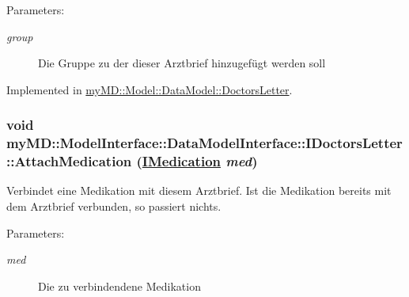 \begin{Desc}
\item[Parameters:]
\begin{description}
\item[{\em group}]Die Gruppe zu der dieser Arztbrief hinzugef\"{u}gt werden soll\end{description}
\end{Desc}


Implemented in \hyperlink{classmy_m_d_1_1_model_1_1_data_model_1_1_doctors_letter_06720c4c5d7e38157063166e916bbf8a}{my\-MD::Model::Data\-Model::Doctors\-Letter}.\hypertarget{interfacemy_m_d_1_1_model_interface_1_1_data_model_interface_1_1_i_doctors_letter_d30d4a881bdfd437b1b1da6f3fa7cb38}{
\subsubsection[AttachMedication]{\setlength{\rightskip}{0pt plus 5cm}void my\-MD::Model\-Interface::Data\-Model\-Interface::IDoctors\-Letter::Attach\-Medication (\hyperlink{interfacemy_m_d_1_1_model_interface_1_1_data_model_interface_1_1_i_medication}{IMedication} {\em med})}}
\label{db/d8c/interfacemy_m_d_1_1_model_interface_1_1_data_model_interface_1_1_i_doctors_letter_d30d4a881bdfd437b1b1da6f3fa7cb38}


Verbindet eine Medikation mit diesem Arztbrief. Ist die Medikation bereits mit dem Arztbrief verbunden, so passiert nichts. 

\begin{Desc}
\item[Parameters:]
\begin{description}
\item[{\em med}]Die zu verbindendene Medikation\end{description}
\end{Desc}


